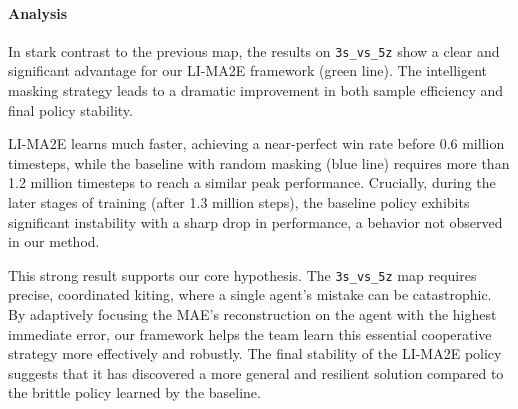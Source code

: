 \paragraph{Analysis}
In stark contrast to the previous map, the results on \texttt{3s\_vs\_5z} show a clear and significant advantage for our LI-MA2E framework (green line). The intelligent masking strategy leads to a dramatic improvement in both sample efficiency and final policy stability.

LI-MA2E learns much faster, achieving a near-perfect win rate before 0.6 million timesteps, while the baseline with random masking (blue line) requires more than 1.2 million timesteps to reach a similar peak performance. Crucially, during the later stages of training (after 1.3 million steps), the baseline policy exhibits significant instability with a sharp drop in performance, a behavior not observed in our method.

This strong result supports our core hypothesis. The \texttt{3s\_vs\_5z} map requires precise, coordinated kiting, where a single agent's mistake can be catastrophic. By adaptively focusing the MAE's reconstruction on the agent with the highest immediate error, our framework helps the team learn this essential cooperative strategy more effectively and robustly. The final stability of the LI-MA2E policy suggests that it has discovered a more general and resilient solution compared to the brittle policy learned by the baseline.



